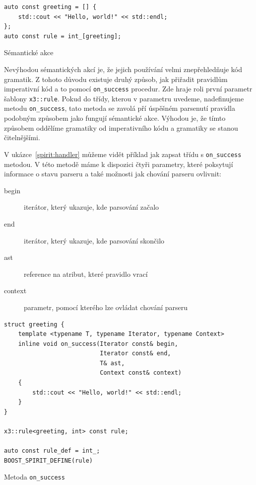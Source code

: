 \documentclass[thesis=B,czech,hidelinks]{FITthesis}[2019/03/06]
\begin{document}
\begin{listing}
\begin{verbatim}
auto const greeting = [] {
    std::cout << "Hello, world!" << std::endl;
};
auto const rule = int_[greeting];
\end{verbatim}
\caption{Sémantické akce}\label{spirit:semantic}
\end{listing}

Nevýhodou sémantických akcí je, že jejich používání velmi znepřehledňuje kód gramatik. Z tohoto důvodu existuje druhý způsob, jak přiřadit pravidlům imperativní kód a to pomocí \verb¨on_success¨ procedur. Zde hraje roli první parametr šablony \texttt{x3::rule}. Pokud do třídy, kterou v parametru uvedeme, nadefinujeme metodu \verb¨on_success¨, tato metoda se zavolá pří úspěšném parsenutí pravidla podobným způsobem jako fungují sémantické akce. Výhodou je, že tímto způsobem oddělíme gramatiky od imperativního kódu a gramatiky se stanou čitelnějšími.

V ukázce~\ref{spirit:handler} můžeme vidět příklad jak zapsat třídu s \verb¨on_success¨ metodou. V této metodě máme k dispozici čtyři parametry, které poksytují informace o stavu parseru a také možnosti jak chování parseru ovlivnit:
\begin{description}
    \item[begin]{iterátor, který ukazuje, kde parsování začalo}
    \item[end]{iterátor, který ukazuje, kde parsování skončilo}
    \item[ast]{reference na atribut, které pravidlo vrací}
    \item[context]{parametr, pomocí kterého lze ovládat chování parseru}
\end{description}

\begin{listing}
\begin{verbatim}
struct greeting {
    template <typename T, typename Iterator, typename Context>
    inline void on_success(Iterator const& begin,
                           Iterator const& end,
                           T& ast,
                           Context const& context)
    {
        std::cout << "Hello, world!" << std::endl;
    }
}

x3::rule<greeting, int> const rule;

auto const rule_def = int_;
BOOST_SPIRIT_DEFINE(rule)
\end{verbatim}
\caption{Metoda \texttt{on\_success}}\label{spirit:handler}
\end{listing}
\end{document}
